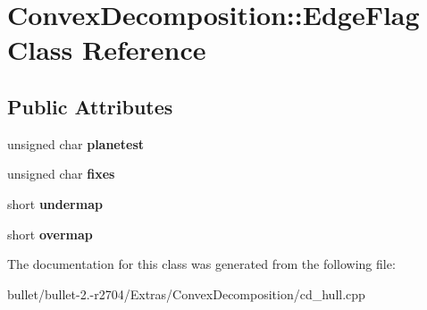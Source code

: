 \hypertarget{class_convex_decomposition_1_1_edge_flag}{\section{Convex\+Decomposition\+:\+:Edge\+Flag Class Reference}
\label{class_convex_decomposition_1_1_edge_flag}
}
\subsection*{Public Attributes}
\begin{DoxyCompactItemize}
\item 
\hypertarget{class_convex_decomposition_1_1_edge_flag_a4651852ea8cef415cfd7e36277ee8358}{unsigned char {\bfseries planetest}}\label{class_convex_decomposition_1_1_edge_flag_a4651852ea8cef415cfd7e36277ee8358}

\item 
\hypertarget{class_convex_decomposition_1_1_edge_flag_ac912a3f577c8f7b3d6a0cc715391ade6}{unsigned char {\bfseries fixes}}\label{class_convex_decomposition_1_1_edge_flag_ac912a3f577c8f7b3d6a0cc715391ade6}

\item 
\hypertarget{class_convex_decomposition_1_1_edge_flag_afdda3771cd502f8c91552260fdd01fce}{short {\bfseries undermap}}\label{class_convex_decomposition_1_1_edge_flag_afdda3771cd502f8c91552260fdd01fce}

\item 
\hypertarget{class_convex_decomposition_1_1_edge_flag_a57bb9da9d8abf335a58d826b60af181f}{short {\bfseries overmap}}\label{class_convex_decomposition_1_1_edge_flag_a57bb9da9d8abf335a58d826b60af181f}

\end{DoxyCompactItemize}


The documentation for this class was generated from the following file\+:\begin{DoxyCompactItemize}
\item 
bullet/bullet-\/2.-\/r2704/\+Extras/\+Convex\+Decomposition/cd\+\_\+hull.\+cpp\end{DoxyCompactItemize}
